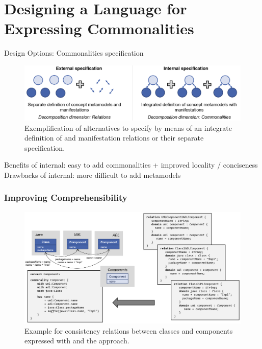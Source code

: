 \chapter{Designing a Language for Expressing Commonalities 
}
\label{chap:language}



Design Options: Commonalities specification

\begin{figure}
    \centering
    \includegraphics[width=\textwidth]{figures/quality/language/design_options.png}
    \caption[Design options for \commonalities specification]{Exemplification of alternatives to specify \commonalities by means of an integrate definition of \conceptmetamodels and manifestation relations or their separate specification.}
    \label{fig:language:design_options}
\end{figure}

Benefits of internal: easy to add commonalities + improved locality / conciseness
Drawbacks of internal: more difficult to add metamodels


\subsection*{Improving Comprehensibility}

\begin{figure}
    \centering
    \includegraphics[width=\textwidth]{figures/quality/language/benefit_comprehensibility.png}
    \caption[Benefit of \commonalities regarding comprehensibility]{Example for consistency relations between classes and components expressed with \qvtr and the \commonalities approach.}
    \label{fig:language:benefit_comprehensibility}
\end{figure}



